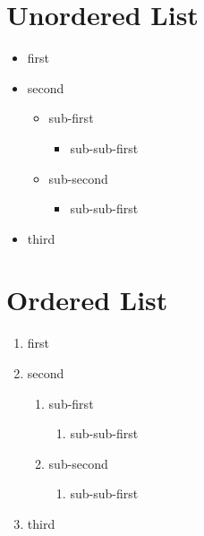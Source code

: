 \documentclass[12pt]{article}
\begin{document}
\section*{Unordered List}
\begin{itemize}
    \item first
    \item second
    \begin{itemize}
        \item sub-first
        \begin{itemize}
            \item sub-sub-first
        \end{itemize}
        \item sub-second
        \begin{itemize}
            \item sub-sub-first
        \end{itemize}
    \end{itemize}
    \item third
\end{itemize}

\section*{Ordered List}
\begin{enumerate}
    \item first
    \item second
    \begin{enumerate}
        \item sub-first
        \begin{enumerate}
            \item sub-sub-first
        \end{enumerate}
        \item sub-second
        \begin{enumerate}
            \item sub-sub-first
        \end{enumerate}
    \end{enumerate}
    \item third
\end{enumerate}
\end{document}

